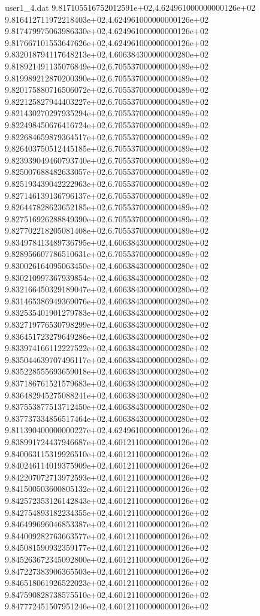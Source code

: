 \begin{filecontents}{user1_4.dat}
9.817105516752012591e+02,4.624961000000000126e+02
9.816412711972218403e+02,4.624961000000000126e+02
9.817479975063986330e+02,4.624961000000000126e+02
9.817667101553647626e+02,4.624961000000000126e+02
9.832018794117648213e+02,4.606384300000000280e+02
9.818921491135076849e+02,6.705537000000000489e+02
9.819989212870200390e+02,6.705537000000000489e+02
9.820175880716506072e+02,6.705537000000000489e+02
9.822125827944403227e+02,6.705537000000000489e+02
9.821430270297935294e+02,6.705537000000000489e+02
9.822498450676416724e+02,6.705537000000000489e+02
9.822684659879364517e+02,6.705537000000000489e+02
9.826403750512445185e+02,6.705537000000000489e+02
9.823939049460793740e+02,6.705537000000000489e+02
9.825007688482633057e+02,6.705537000000000489e+02
9.825193439042222963e+02,6.705537000000000489e+02
9.827146139136796137e+02,6.705537000000000489e+02
9.826447828623652185e+02,6.705537000000000489e+02
9.827516926288849390e+02,6.705537000000000489e+02
9.827702218205081408e+02,6.705537000000000489e+02
9.834978413489736795e+02,4.606384300000000280e+02
9.828956607786510631e+02,6.705537000000000489e+02
9.830026164095063450e+02,4.606384300000000280e+02
9.830210997367939854e+02,4.606384300000000280e+02
9.832166450329189047e+02,4.606384300000000280e+02
9.831465386949369076e+02,4.606384300000000280e+02
9.832535401901279783e+02,4.606384300000000280e+02
9.832719776530798299e+02,4.606384300000000280e+02
9.836451723279649286e+02,4.606384300000000280e+02
9.833974166112227522e+02,4.606384300000000280e+02
9.835044639707496117e+02,4.606384300000000280e+02
9.835228555693659018e+02,4.606384300000000280e+02
9.837186761521579683e+02,4.606384300000000280e+02
9.836482945275088241e+02,4.606384300000000280e+02
9.837553877513712450e+02,4.606384300000000280e+02
9.837737334856517464e+02,4.606384300000000280e+02
9.811390400000000227e+02,4.624961000000000126e+02
9.838991724437946687e+02,4.601211000000000126e+02
9.840063115319926510e+02,4.601211000000000126e+02
9.840246114019375909e+02,4.601211000000000126e+02
9.842207072713972593e+02,4.601211000000000126e+02
9.841500503600805132e+02,4.601211000000000126e+02
9.842572353126142843e+02,4.601211000000000126e+02
9.842754893182234355e+02,4.601211000000000126e+02
9.846499696046853387e+02,4.601211000000000126e+02
9.844009282763663577e+02,4.601211000000000126e+02
9.845081590932359177e+02,4.601211000000000126e+02
9.845263672345092800e+02,4.601211000000000126e+02
9.847227383906365503e+02,4.601211000000000126e+02
9.846518061926522023e+02,4.601211000000000126e+02
9.847590828738575510e+02,4.601211000000000126e+02
9.847772451507951246e+02,4.601211000000000126e+02

\end{filecontents}
